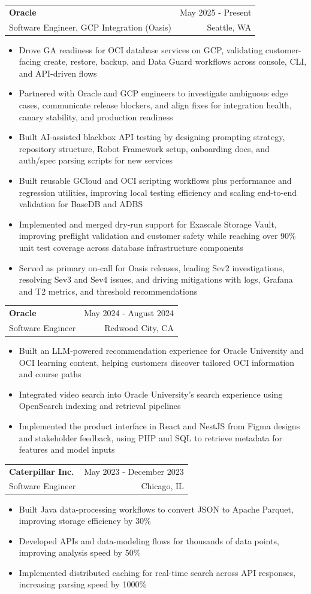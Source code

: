 \documentclass[letterpaper,11pt]{article}
\makeatletter
\newcommand{\resumeItem}[1]{
  \item\small{
    {#1 \vspace{-1pt}}
  }
}
\newcommand{\resumeSubheading}[4]{
  \vspace{-2pt}\item
    \begin{tabular*}{0.97\textwidth}[t]{l@{\extracolsep{\fill}}r}
      \textbf{#1} & #2 \\
      {\small#3} & {\small #4} \\
    \end{tabular*}\vspace{-7pt}
}
\newcommand{\resumeItemListStart}{\begin{itemize}[leftmargin=0.18in,itemsep=1pt,topsep=2pt]}
\newcommand{\resumeItemListEnd}{\end{itemize}\vspace{-5pt}}
\makeatother
\begin{document}
    \resumeSubheading
  {Oracle}{May 2025 - Present}
  {Software Engineer, GCP Integration (Oasis)}{Seattle, WA}
  \resumeItemListStart
    \resumeItem{Drove GA readiness for OCI database services on GCP, validating customer-facing create, restore, backup, and Data Guard workflows across console, CLI, and API-driven flows}
    \resumeItem{Partnered with Oracle and GCP engineers to investigate ambiguous edge cases, communicate release blockers, and align fixes for integration health, canary stability, and production readiness}
    \resumeItem{Built AI-assisted blackbox API testing by designing prompting strategy, repository structure, Robot Framework setup, onboarding docs, and auth/spec parsing scripts for new services}
    \resumeItem{Built reusable GCloud and OCI scripting workflows plus performance and regression utilities, improving local testing efficiency and scaling end-to-end validation for BaseDB and ADBS}
    \resumeItem{Implemented and merged dry-run support for Exascale Storage Vault, improving preflight validation and customer safety while reaching over 90\% unit test coverage across database infrastructure components}
    \resumeItem{Served as primary on-call for Oasis releases, leading Sev2 investigations, resolving Sev3 and Sev4 issues, and driving mitigations with logs, Grafana and T2 metrics, and threshold recommendations}
  \resumeItemListEnd

    \resumeSubheading
      {Oracle}{May 2024 - August 2024}
      {Software Engineer}{Redwood City, CA}
      \resumeItemListStart
        \resumeItem{Built an LLM-powered recommendation experience for Oracle University and OCI learning content, helping customers discover tailored OCI information and course paths}
        \resumeItem{Integrated video search into Oracle University's search experience using OpenSearch indexing and retrieval pipelines}
        \resumeItem{Implemented the product interface in React and NestJS from Figma designs and stakeholder feedback, using PHP and SQL to retrieve metadata for features and model inputs}
      \resumeItemListEnd

    \resumeSubheading
      {Caterpillar Inc.}{May 2023 - December 2023}
      {Software Engineer}{Chicago, IL}
      \resumeItemListStart
        \resumeItem{Built Java data-processing workflows to convert JSON to Apache Parquet, improving storage efficiency by 30\%}
        \resumeItem{Developed APIs and data-modeling flows for thousands of data points, improving analysis speed by 50\%}
        \resumeItem{Implemented distributed caching for real-time search across API responses, increasing parsing speed by 1000\%}
      \resumeItemListEnd
\end{document}
